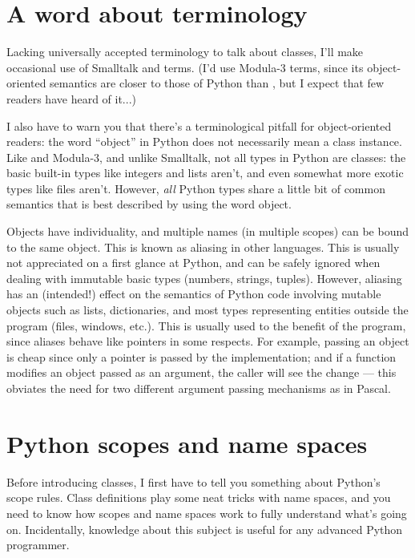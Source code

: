 \section{A word about terminology}

Lacking universally accepted terminology to talk about classes, I'll
make occasional use of Smalltalk and \Cpp{} terms.  (I'd use Modula-3
terms, since its object-oriented semantics are closer to those of
Python than \Cpp{}, but I expect that few readers have heard of it...)

I also have to warn you that there's a terminological pitfall for
object-oriented readers: the word ``object'' in Python does not
necessarily mean a class instance.  Like \Cpp{} and Modula-3, and unlike
Smalltalk, not all types in Python are classes: the basic built-in
types like integers and lists aren't, and even somewhat more exotic
types like files aren't.  However, {\em all} Python types share a little
bit of common semantics that is best described by using the word
object.

Objects have individuality, and multiple names (in multiple scopes)
can be bound to the same object.  This is known as aliasing in other
languages.  This is usually not appreciated on a first glance at
Python, and can be safely ignored when dealing with immutable basic
types (numbers, strings, tuples).  However, aliasing has an
(intended!) effect on the semantics of Python code involving mutable
objects such as lists, dictionaries, and most types representing
entities outside the program (files, windows, etc.).  This is usually
used to the benefit of the program, since aliases behave like pointers
in some respects.  For example, passing an object is cheap since only
a pointer is passed by the implementation; and if a function modifies
an object passed as an argument, the caller will see the change --- this
obviates the need for two different argument passing mechanisms as in
Pascal.


\section{Python scopes and name spaces}

Before introducing classes, I first have to tell you something about
Python's scope rules.  Class definitions play some neat tricks with
name spaces, and you need to know how scopes and name spaces work to
fully understand what's going on.  Incidentally, knowledge about this
subject is useful for any advanced Python programmer.

